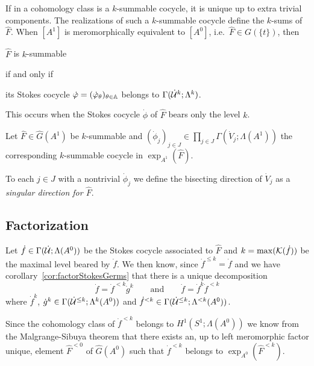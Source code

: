 If in a cohomology class is a $k$-summable cocycle, it is unique up to extra
trivial components.
The realizations of such a $k$-summable cocycle define the $k$-sums of
$\hat F$.
When $[A^1]$ is meromorphically equivalent to $[A^0]$,
i.e.\ $\hat F\in G(\!\{t\}\!)$, then
\begin{einr}
  $\hat F$ is $k$-summable
\end{einr}
if and only if
\begin{einr}
  its Stokes cocycle $\dot{\varphi}=(\dot{\varphi}_\theta)_{\theta\in\mathbb{A}}$ belongs to
  $\Gamma(\dot{\mathcal{U}}^k;\Lambda^k)$.
\end{einr}
This occurs when the Stokes cocycle $\dot\phi$ of $\hat F$ bears only the level
$k$.

\begin{comment}
  \cite[883]{Loday1994} Turrittin's problem
\end{comment}

\begin{defn}\label{defn:singlDir}
  Let $\hat F\in\hat G(A^1)$ be $k$-summable and $(\dot\phi_j)_{j\in
  J}\in\prod_{j\in J}\Gamma(\dot V_j;\Lambda(A^1))$ the corresponding
  $k$-summable cocycle in $\exp_{A^1}(\hat F)$.

  To each $j\in J$ with a nontrivial $\dot\phi_j$ we define the bisecting
  direction of $\dot V_j$ as a \emph{singular direction for $\hat F$}.
\end{defn}

\subsection{Factorization}

Let $\dot f\in\Gamma(\dot{\mathcal{U}};\Lambda(A^0))$ be the Stokes cocycle associated to
$\hat F$ and $k=\max(\mathcal{K}(\dot f))$ be the maximal level beared by $\dot f$.
We then know, since $\dot f^{\leq k}=\dot f$ and we have
corollary~\ref{cor:factorStokesGerms} that there is a unique decomposition
\[
  \dot f=\dot f^{<k}\dot g^k
  \qquad\text{and}\qquad
  \dot f=\dot f^k\dot f^{<k}
\]
where $\dot f^k$, $\dot g^k\in\Gamma(\dot{\mathcal{U}}^{\leq k};\Lambda^k(A^0))$ and
$\dot f^{<k}\in\Gamma(\dot{\mathcal{U}}^{\leq k};\Lambda^{<k}(A^0))$.

Since the cohomology class of $\dot f^{<k}$ belongs to $H^1(S^1;\Lambda(A^0))$
we know from the Malgrange-Sibuya theorem that there exists an, up to left
meromorphic factor unique, element $\hat F^{<0}$ of $\hat G(A^0)$ such that
$\dot f^{<k}$ belongs to $\exp_{A^0}(\hat F^{<k})$.

